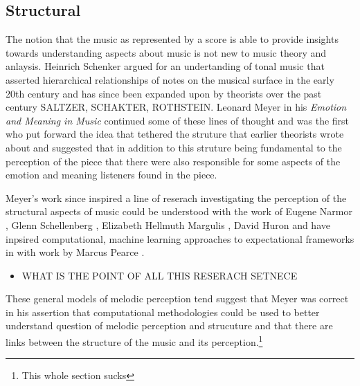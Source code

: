 \documentclass[]{book}
\providecommand{\tightlist}{%
  \setlength{\itemsep}{0pt}\setlength{\parskip}{0pt}}
\let\rmarkdownfootnote\footnote%
\def\footnote{\protect\rmarkdownfootnote}
\theoremstyle{definition}
\theoremstyle{definition}
\theoremstyle{definition}
\theoremstyle{remark}
\begin{document}
\hypertarget{structural}{%
\subsection{Structural}\label{structural}}

The notion that the music as represented by a score is able to provide
insights towards understanding aspects about music is not new to music
theory and anlaysis. Heinrich Schenker argued for an undertanding of
tonal music \citep{schenkerFreieSatz1935} that asserted hierarchical
relationships of notes on the musical surface in the early 20th century
and has since been expanded upon by theorists over the past century
SALTZER, SCHAKTER, ROTHSTEIN. Leonard Meyer in his \emph{Emotion and
Meaning in Music} \citep{meyerEmotionMeaningMusic1956} continued some of
these lines of thought and was the first who put forward the idea that
tethered the struture that earlier theorists wrote about and suggested
that in addition to this struture being fundamental to the perception of
the piece that there were also responsible for some aspects of the
emotion and meaning listeners found in the piece.

Meyer's work since inspired a line of reserach investigating the
perception of the structural aspects of music could be understood with
the work of Eugene Narmor
\citep{narmourAnalysisCognitionBasic1990, narmourAnalysisCognitionMelodic1992},
Glenn Schellenberg
\citep{schellenbergSimplifyingImplicationRealizationModel1997},
Elizabeth Hellmuth Margulis \citep{margulisModelMelodicExpectation2005},
David Huron \citep{huronSweetAnticipation2006} and have inpsired
computational, machine learning approaches to expectational frameworks
in with work by Marcus Pearce
\citep{pearceAuditoryExpectationInformation2012}.

\begin{itemize}
\tightlist
\item
  WHAT IS THE POINT OF ALL THIS RESERACH SETNECE
\end{itemize}

These general models of melodic perception tend suggest that Meyer was
correct in his assertion that computational methodologies could be used
to better understand question of melodic perception and strucuture and
that there are links between the structure of the music and its
perception.\footnote{This whole section sucks}
\end{document}
